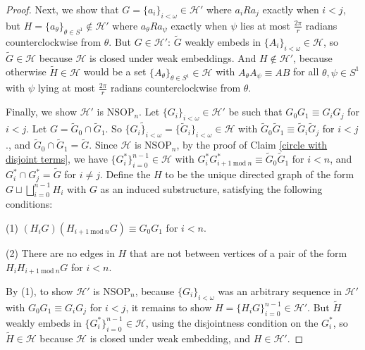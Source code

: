 \documentclass{amsart}
\theoremstyle{definition}
\theoremstyle{remark}
\numberwithin{equation}{section}
\begin{document}
\begin{proof}
    Next, we show that $G=\{a_{i}\}_{i < \omega} \in \mathcal{H}'$ where $a_{i} R a_{j}$ exactly when $i < j$, but $H=\{a_{\theta}\}_{\theta \in S^{1}} \notin \mathcal{H}'$ where $a_{\theta} R a_{\psi}$ exactly when $\psi$ lies at most $\frac{2\pi}{r}$ radians counterclockwise from $\theta$. But $G \in \mathcal{H}'$: $\tilde{G}$ weakly embeds in $\{ A_{i}\}_{i < \omega} \in \mathcal{H}$, so $\tilde{G} \in \mathcal{H}$ because $\mathcal{H}$ is closed under weak embeddings. And $H \notin \mathcal{H}'$, because otherwise $\tilde{H} \in \mathcal{H}$ would be a set $\{ A_{\theta}\}_{\theta \in S^{1}} \in \mathcal{H}$ with $A_{\theta}A_{\psi} \equiv AB$ for all $\theta, \psi \in S^{1}$ with $\psi$ lying at most $\frac{2\pi}{r}$ radians counterclockwise from $\theta$.

    Finally, we show $\mathcal{H}'$ is $\mathrm{NSOP}_{n}$. Let $\{G_{i}\}_{i < \omega} \in \mathcal{H}'$ be such that $G_{0} G_{1} \equiv G_{i}G_{j} $ for $i < j$. Let $G = \tilde{G}_{0} \cap \tilde{G}_{1}$. So $\widetilde{\{G_{i}\}_{i < \omega}}=\{\tilde{G}_{i}\}_{i < \omega} \in \mathcal{H}$ with $\tilde{G}_{0} \tilde{G}_{1} \equiv \tilde{G}_{i}\tilde{G}_{j} $ for $i < j$., and $\tilde{G}_{0} \cap \tilde{G}_{1} = \tilde{G}$. Since $\mathcal{H}$ is $\mathrm{NSOP}_{n}$, by the proof of Claim \ref{circle with disjoint terms}, we have $\{G^{*}_{i}\}^{n-1}_{i =0} \in \mathcal{H}$ with $G^{*}_{i}G^{*}_{i+1 \mathrm{\: mod \:}n}\equiv \tilde{G}_{0} \tilde{G}_{1} $ for $i < n$, and $G^{*}_{i} \cap G^{*}_{j} = \tilde{G}$ for $i \neq j$. Define the $H$ to be the unique directed graph of the form  $G \sqcup \bigsqcup^{n-1}_{i=0} H_{i}$ with $G$ as an induced substructure, satisfying the following conditions:

    (1) $(H_{i}G)(H_{i+1 \mathrm{\: mod \:}n}G)\equiv G_{0} G_{1} $ for $i < n$.

    (2) There are no edges in $H$ that are not between vertices of a pair of the form $H_{i}H_{i+1 \mathrm{\: mod \:}n}G$ for $i < n$.

    By (1), to show $\mathcal{H}'$ is $\mathrm{NSOP}_{n}$, because  $\{G_{i}\}_{i < \omega}$ was an arbitrary sequence in $\mathcal{H}'$ with $G_{0} G_{1} \equiv G_{i}G_{j} $ for $i < j$, it remains to show $H = \{H_{i}G\}^{n-1}_{i=0} \in \mathcal{H}'$. But $\tilde{H}$ weakly embeds in $\{G^{*}_{i}\}^{n-1}_{i =0} \in \mathcal{H}$, using the disjointness condition on the $G^{*}_{i}$, so $\tilde{H} \in \mathcal{H}$ because $\mathcal{H}$ is closed under weak embedding, and $H \in \mathcal{H}'$.
\end{proof}
\end{document}
